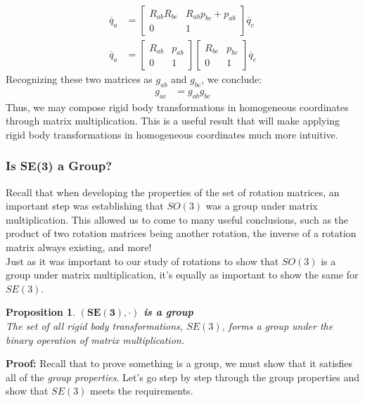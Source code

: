 \documentclass[oneside]{book}
\newtheorem{proposition}{Proposition}
\newenvironment{prop} %
  {\colorlet{shadecolor}{blue!9}\begin{shaded}\begin{proposition}}
  {\end{proposition}\end{shaded}}
\begin{document}
\begin{align}
    \overline{q}_a
    &= 
    \begin{bmatrix}
    R_{ab}R_{bc} & R_{ab}p_{bc} + p_{ab}\\
    0 & 1
    \end{bmatrix}
    \overline{q}_c\\
    \overline{q}_a
    &= 
    \begin{bmatrix}
    R_{ab} & p_{ab}\\
    0 & 1
    \end{bmatrix}
    \begin{bmatrix}
    R_{bc} & p_{bc}\\
    0 & 1
    \end{bmatrix}
    \overline{q}_c
\end{align}
Recognizing these two matrices as $g_{ab}$ and $g_{bc}$, we conclude:
\begin{align}
    g_{ac} &= g_{ab}g_{bc}
\end{align}
Thus, we may compose rigid body transformations in homogeneous coordinates through matrix multiplication. This is a useful result that will make applying rigid body transformations in homogeneous coordinates much more intuitive.

\subsubsection{Is SE(3) a Group?}
Recall that when developing the properties of the set of rotation matrices, an important step was establishing that $SO(3)$ was a group under matrix multiplication. This allowed us to come to many useful conclusions, such as the product of two rotation matrices being another rotation, the inverse of a rotation matrix always existing, and more!\\
Just as it was important to our study of rotations to show that $SO(3)$ is a group under matrix multiplication, it's equally as important to show the same for $SE(3)$.
\begin{prop}
\textbf{$\mathbf{(SE(3), \cdot)}$ is a group}\\
The set of all rigid body transformations, $SE(3)$, forms a group under the binary operation of matrix multiplication.
\end{prop}
\noindent
\textbf{Proof:}
Recall that to prove something is a group, we must show that it satisfies all of the \textit{group properties}. Let's go step by step through the group properties and show that $SE(3)$ meets the requirements.
\end{document}
